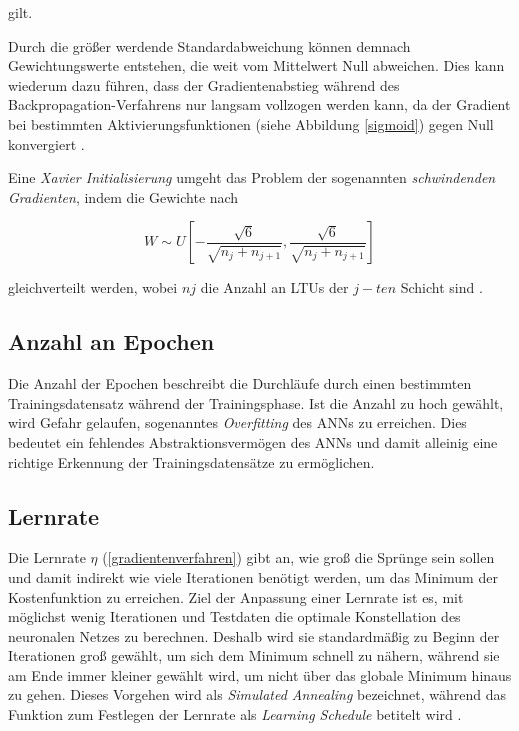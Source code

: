 gilt.

Durch die größer werdende Standardabweichung können demnach Gewichtungswerte entstehen, die weit vom Mittelwert Null abweichen. Dies kann wiederum dazu führen, dass der Gradientenabstieg während des Backpropagation-Verfahrens nur langsam vollzogen werden kann, da der Gradient bei bestimmten Aktivierungsfunktionen (siehe Abbildung \ref{sigmoid}) gegen Null konvergiert \cite{AurelienGeron.2018}. 

Eine \textit{Xavier Initialisierung} umgeht das Problem der sogenannten \textit{schwindenden Gradienten}, indem die Gewichte nach

\begin{equation} \label{xavier}
W \sim U[-\frac{\sqrt{6}}{\sqrt{n_{j} + n_{j+1}}},\frac{\sqrt{6}}{\sqrt{n_{j} + n_{j+1}}}]
\end{equation}

gleichverteilt werden, wobei $n{j}$ die Anzahl an LTUs der $j-ten$ Schicht sind \cite{XavierGlorot.2010}.

\subsection*{Anzahl an Epochen}

Die Anzahl der Epochen beschreibt die Durchläufe durch einen bestimmten Trainingsdatensatz während der Trainingsphase. Ist die Anzahl zu hoch gewählt, wird Gefahr gelaufen, sogenanntes \textit{Overfitting} des ANNs zu erreichen. Dies bedeutet ein fehlendes Abstraktionsvermögen des ANNs und damit alleinig eine richtige Erkennung der Trainingsdatensätze zu ermöglichen.  

\subsection*{Lernrate}

Die Lernrate $\eta$ (\ref{gradientenverfahren}) gibt an, wie groß die Sprünge sein sollen und damit indirekt wie viele Iterationen benötigt werden, um das Minimum der Kostenfunktion zu erreichen. Ziel der Anpassung einer Lernrate ist es, mit möglichst wenig Iterationen und Testdaten die optimale Konstellation des neuronalen Netzes zu berechnen. Deshalb wird sie standardmäßig zu Beginn der Iterationen groß gewählt, um sich dem Minimum schnell zu nähern, während sie am Ende immer kleiner gewählt wird, um nicht über das globale Minimum hinaus zu gehen. Dieses Vorgehen wird als \textit{Simulated Annealing} bezeichnet, während das Funktion zum Festlegen der Lernrate als \textit{Learning Schedule} betitelt wird \cite{AurelienGeron.2018}.

